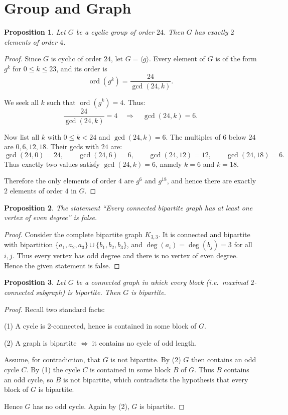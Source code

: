 \documentclass{article}
\theoremstyle{plain}
\newtheorem{proposition}{Proposition}
\theoremstyle{definition}
\theoremstyle{remark}
\begin{document}
\section{Group and Graph}
\begin{proposition}
Let $G$ be a cyclic group of order $24$. Then $G$ has exactly $2$ elements of order $4$.
\end{proposition}

\begin{proof}
Since $G$ is cyclic of order $24$, let $G=\langle g\rangle$. Every element of $G$
is of the form $g^k$ for $0\le k\le 23$, and its order is
\[
\operatorname{ord}(g^k)=\frac{24}{\gcd(24,k)}.
\]

We seek all $k$ such that $\operatorname{ord}(g^k)=4$. Thus:
\[
\frac{24}{\gcd(24,k)}=4
\quad\Longrightarrow\quad
\gcd(24,k)=6.
\]

Now list all $k$ with $0\le k<24$ and $\gcd(24,k)=6$. The multiples of $6$
below $24$ are $0,6,12,18$. Their gcds with $24$ are:
\[
\gcd(24,0)=24,\qquad
\gcd(24,6)=6,\qquad
\gcd(24,12)=12,\qquad
\gcd(24,18)=6.
\]
Thus exactly two values satisfy $\gcd(24,k)=6$, namely $k=6$ and $k=18$.

Therefore the only elements of order $4$ are $g^6$ and $g^{18}$, and hence
there are exactly $2$ elements of order $4$ in $G$.
\end{proof}
\begin{proposition}
The statement
``Every connected bipartite graph has at least one vertex of even degree''
is false.
\end{proposition}

\begin{proof}
Consider the complete bipartite graph $K_{3,3}$. It is connected and
bipartite with bipartition $\{a_1,a_2,a_3\}\cup\{b_1,b_2,b_3\}$, and
$\deg(a_i)=\deg(b_j)=3$ for all $i,j$. Thus every vertex has odd degree and
there is no vertex of even degree. Hence the given statement is false.
\end{proof}
\begin{proposition}
Let $G$ be a connected graph in which every block (i.e.\ maximal $2$-connected
subgraph) is bipartite. Then $G$ is bipartite.
\end{proposition}

\begin{proof}
Recall two standard facts:

(1) A cycle is $2$-connected, hence is contained in some block of $G$.

(2) A graph is bipartite $\iff$ it contains no cycle of odd length.

\medskip
Assume, for contradiction, that $G$ is not bipartite. By (2) $G$ then
contains an odd cycle $C$. By (1) the cycle $C$ is contained in some block
$B$ of $G$. Thus $B$ contains an odd cycle, so $B$ is not bipartite, which
contradicts the hypothesis that every block of $G$ is bipartite.

Hence $G$ has no odd cycle. Again by (2), $G$ is bipartite.
\end{proof}
\end{document}
